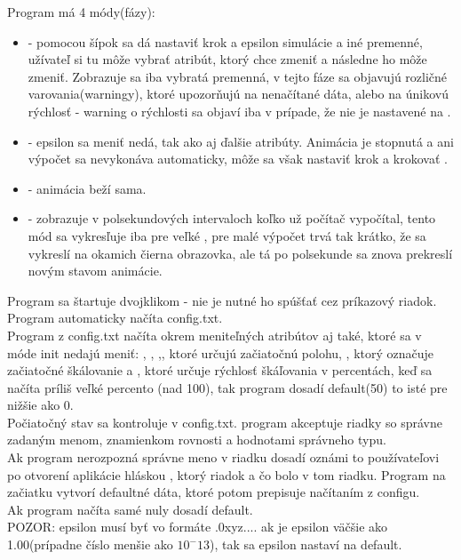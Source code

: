 \tab[5 mm] Program má 4 módy(fázy):
\begin{itemize}
\item	{} - pomocou šípok  sa dá nastaviť krok a epsilon simulácie a iné premenné, užívateľ si tu môže vybrať atribút, ktorý chce zmeniť a následne ho môže zmeniť. Zobrazuje sa iba vybratá premenná, v tejto fáze sa objavujú rozličné varovania(warningy), ktoré upozorňujú na nenačítané dáta, alebo na únikovú rýchlosť   -  warning o rýchlosti sa objaví iba v prípade, že nie je nastavené   na .
\item	{} -  epsilon sa meniť nedá, tak ako aj ďalšie atribúty. Animácia je stopnutá a ani výpočet sa nevykonáva automaticky, môže sa však nastaviť krok a krokovať .
\item	{} - animácia beží sama.
\item	{} - zobrazuje v polsekundových intervaloch koľko už počítač vypočítal, tento mód sa vykresľuje iba pre veľké , pre malé výpočet trvá tak krátko, že sa vykreslí na okamich čierna obrazovka, ale tá po polsekunde sa znova prekreslí novým stavom animácie.  
\end{itemize}
\tab[5 mm] Program sa štartuje dvojklikom - nie je nutné ho spúšťať cez príkazový riadok. Program automaticky načíta config.txt.\\
\tab[5 mm] Program z config.txt načíta okrem meniteľných atribútov aj také, ktoré sa v móde init nedajú meniť: , , ,, ktoré určujú začiatočnú polohu,  , ktorý označuje začiatočné škálovanie a , ktoré určuje rýchlosť škáľovania v percentách, keď sa načíta príliš veľké percento (nad 100), tak program dosadí default(50) to isté pre nižšie ako 0.\\ 
\tab[5 mm] Počiatočný stav sa kontroluje v config.txt. program akceptuje riadky so správne zadaným menom, znamienkom rovnosti a hodnotami správneho typu.\\
\tab[5 mm] Ak program nerozpozná správne meno v riadku dosadí  oznámi to používateľovi po otvorení aplikácie hláskou , ktorý riadok a čo bolo v tom riadku.  Program na začiatku vytvorí defaultné dáta, ktoré potom prepisuje načítaním z configu. \\
\tab[5 mm] Ak program načíta samé nuly dosadí default.\\
\tab[5 mm] POZOR: epsilon musí byť vo formáte .0xyz.... ak je epsilon väčšie ako 1.00(prípadne číslo menšie ako \(10^-13\)), tak sa epsilon nastaví na default.\\
